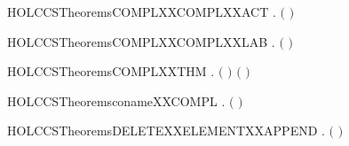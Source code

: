 \begin{SaveVerbatim}{HOLCCSTheoremsCOMPLXXCOMPLXXACT}
\HOLTokenTurnstile{} \HOLSymConst{\HOLTokenForall{}}.  \ensuremath{(} \ensuremath{)} \HOLSymConst{\ensuremath{=}} 
\end{SaveVerbatim}
\newcommand{\HOLCCSTheoremsCOMPLXXCOMPLXXACT}{\UseVerbatim{HOLCCSTheoremsCOMPLXXCOMPLXXACT}}
\begin{SaveVerbatim}{HOLCCSTheoremsCOMPLXXCOMPLXXLAB}
\HOLTokenTurnstile{} \HOLSymConst{\HOLTokenForall{}}.  \ensuremath{(} \ensuremath{)} \HOLSymConst{\ensuremath{=}} 
\end{SaveVerbatim}
\newcommand{\HOLCCSTheoremsCOMPLXXCOMPLXXLAB}{\UseVerbatim{HOLCCSTheoremsCOMPLXXCOMPLXXLAB}}
\begin{SaveVerbatim}{HOLCCSTheoremsCOMPLXXTHM}
\HOLTokenTurnstile{} \HOLSymConst{\HOLTokenForall{}} .
       \ensuremath{(} \HOLSymConst{\HOLTokenNotEqual{}}   \HOLSymConst{\HOLTokenImp{}}   \HOLSymConst{\HOLTokenNotEqual{}}  \ensuremath{)} \HOLSymConst{\HOLTokenConj{}}
       \ensuremath{(} \HOLSymConst{\HOLTokenNotEqual{}}   \HOLSymConst{\HOLTokenImp{}}   \HOLSymConst{\HOLTokenNotEqual{}}  \ensuremath{)}
\end{SaveVerbatim}
\newcommand{\HOLCCSTheoremsCOMPLXXTHM}{\UseVerbatim{HOLCCSTheoremsCOMPLXXTHM}}
\begin{SaveVerbatim}{HOLCCSTheoremsconameXXCOMPL}
\HOLTokenTurnstile{} \HOLSymConst{\HOLTokenForall{}}.   \HOLSymConst{\ensuremath{=}}  \ensuremath{(} \ensuremath{)}
\end{SaveVerbatim}
\newcommand{\HOLCCSTheoremsconameXXCOMPL}{\UseVerbatim{HOLCCSTheoremsconameXXCOMPL}}
\begin{SaveVerbatim}{HOLCCSTheoremsDELETEXXELEMENTXXAPPEND}
\HOLTokenTurnstile{} \HOLSymConst{\HOLTokenForall{}}  .
         \ensuremath{(} \HOLSymConst{++} \ensuremath{)} \HOLSymConst{\ensuremath{=}}
          \HOLSymConst{++}   
\end{SaveVerbatim}
